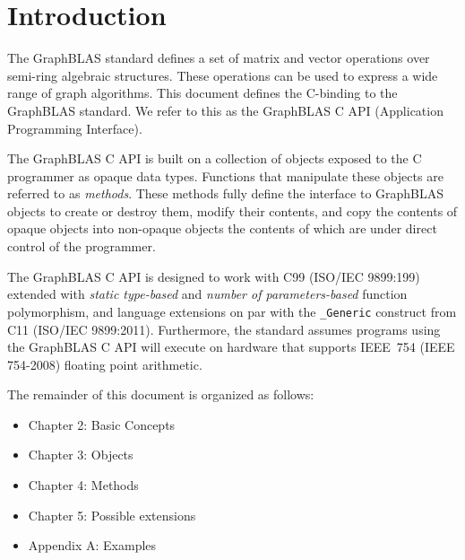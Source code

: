 \documentclass[11pt]{extbook}
\begin{document}



\chapter{Introduction}

The GraphBLAS standard defines a set of matrix and vector operations 
over semi-ring algebraic structures.  These operations can be used
to express a wide range of graph algorithms.   This document 
defines the C-binding to the GraphBLAS standard.   We refer to 
this as the GraphBLAS C API (Application Programming Interface).   

The GraphBLAS C API is built on a collection of objects exposed to 
the C programmer as opaque data types. Functions that manipulate these
objects are referred to as {\it methods}.  These methods fully define the 
interface to GraphBLAS objects to create or destroy them, modify their 
contents, and copy the contents of opaque objects into non-opaque objects the 
contents of which are under direct control of the programmer.

The GraphBLAS C API is designed to work with C99 (ISO/IEC 9899:199) 
extended with {\it static type-based} and {\it number of parameters-based}
function polymorphism, and language extensions on par with 
the {\tt \_Generic} construct from C11 (ISO/IEC 9899:2011).  
Furthermore, the standard assumes programs using the GraphBLAS C API
will execute on hardware that supports IEEE~754 (IEEE 754-2008) 
floating point arithmetic.

The remainder of this document is organized as follows:
\begin{itemize}
\item Chapter 2: Basic Concepts
\item Chapter 3: Objects
\item Chapter 4: Methods
\item Chapter 5: Possible extensions
\item Appendix A: Examples
\end{itemize}





\end{document}
